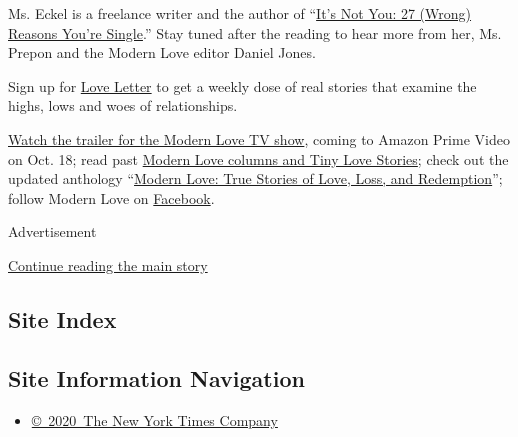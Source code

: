 Ms. Eckel is a freelance writer and the author of
``\href{https://saraeckel.com/}{It's Not You: 27 (Wrong) Reasons You're
Single}.'' Stay tuned after the reading to hear more from her, Ms.
Prepon and the Modern Love editor Daniel Jones.

Sign up for
\href{https://www.nytimes3xbfgragh.onion/newsletters/love-letter}{Love
Letter} to get a weekly dose of real stories that examine the highs,
lows and woes of relationships.

\href{https://www.nytimes3xbfgragh.onion/2019/09/12/style/modern-love-tv-show-trailer.html}{Watch
the trailer for the Modern Love TV show}, coming to Amazon Prime Video
on Oct. 18; read past
\href{https://www.nytimes3xbfgragh.onion/column/modern-love}{Modern Love
columns and Tiny Love Stories}; check out the updated anthology
``\href{https://www.penguinrandomhouse.com/books/623036/modern-love-revised-and-updated-by-edited-by-daniel-jones-with-contributions-by-andrew-rannells-ayelet-waldman-amy-krouse-rosenthal-veronica-chambers-and-more/}{Modern
Love: True Stories of Love, Loss, and Redemption}''; follow Modern Love
on \href{https://www.facebookcorewwwi.onion/modernlove}{Facebook}.

Advertisement

\protect\hyperlink{after-bottom}{Continue reading the main story}

\hypertarget{site-index}{%
\subsection{Site Index}\label{site-index}}

\hypertarget{site-information-navigation}{%
\subsection{Site Information
Navigation}\label{site-information-navigation}}

\begin{itemize}
\tightlist
\item
  \href{https://help.nytimes3xbfgragh.onion/hc/en-us/articles/115014792127-Copyright-notice}{©~2020~The
  New York Times Company}
\end{itemize}

